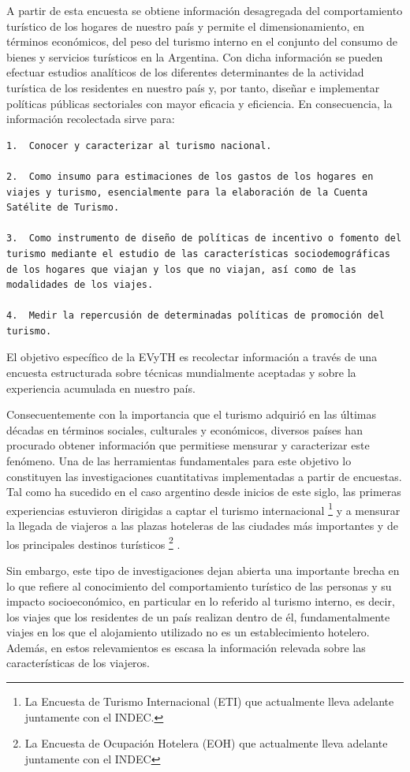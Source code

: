 \documentclass[
  openany]{book}
\begin{document}
A partir de esta encuesta se obtiene información desagregada del comportamiento turístico de los hogares de nuestro país y permite el dimensionamiento, en términos económicos, del peso del turismo interno en el conjunto del consumo de bienes y servicios turísticos en la Argentina. Con dicha información se pueden efectuar estudios analíticos de los diferentes determinantes de la actividad turística de los residentes en nuestro país y, por tanto, diseñar e implementar políticas públicas sectoriales con mayor eficacia y eficiencia. En consecuencia, la información recolectada sirve para:

\begin{verbatim}
1.  Conocer y caracterizar al turismo nacional.

2.  Como insumo para estimaciones de los gastos de los hogares en viajes y turismo, esencialmente para la elaboración de la Cuenta Satélite de Turismo.

3.  Como instrumento de diseño de políticas de incentivo o fomento del turismo mediante el estudio de las características sociodemográficas de los hogares que viajan y los que no viajan, así como de las modalidades de los viajes.

4.  Medir la repercusión de determinadas políticas de promoción del turismo.
\end{verbatim}

El objetivo específico de la EVyTH es recolectar información a través de una encuesta estructurada sobre técnicas mundialmente aceptadas y sobre la experiencia acumulada en nuestro país.

Consecuentemente con la importancia que el turismo adquirió en las últimas décadas en términos sociales, culturales y económicos, diversos países han procurado obtener información que permitiese mensurar y caracterizar este fenómeno. Una de las herramientas fundamentales para este objetivo lo constituyen las investigaciones cuantitativas implementadas a partir de encuestas. Tal como ha sucedido en el caso argentino desde inicios de este siglo, las primeras experiencias estuvieron dirigidas a captar el turismo internacional \footnote{La Encuesta de Turismo Internacional (ETI) que actualmente lleva adelante juntamente con el INDEC.} y a mensurar la llegada de viajeros a las plazas hoteleras de las ciudades más importantes y de los principales destinos turísticos \footnote{La Encuesta de Ocupación Hotelera (EOH) que actualmente lleva adelante juntamente con el INDEC} .

Sin embargo, este tipo de investigaciones dejan abierta una importante brecha en lo que refiere al conocimiento del comportamiento turístico de las personas y su impacto socioeconómico, en particular en lo referido al turismo interno, es decir, los viajes que los residentes de un país realizan dentro de él, fundamentalmente viajes en los que el alojamiento utilizado no es un establecimiento hotelero. Además, en estos relevamientos es escasa la información relevada sobre las características de los viajeros.
\end{document}
